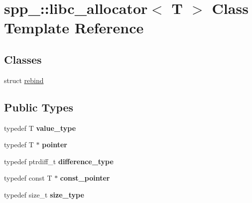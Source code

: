 \hypertarget{classspp___1_1libc__allocator}{}\section{spp\+\_\+\+:\+:libc\+\_\+allocator$<$ T $>$ Class Template Reference}
\label{classspp___1_1libc__allocator}
\subsection*{Classes}
\begin{DoxyCompactItemize}
\item 
struct \hyperlink{structspp___1_1libc__allocator_1_1rebind}{rebind}
\end{DoxyCompactItemize}
\subsection*{Public Types}
\begin{DoxyCompactItemize}
\item 
typedef T {\bfseries value\+\_\+type}\hypertarget{classspp___1_1libc__allocator_afe4fa699e49fd1c2f4b82547d164698e}{}\label{classspp___1_1libc__allocator_afe4fa699e49fd1c2f4b82547d164698e}

\item 
typedef T $\ast$ {\bfseries pointer}\hypertarget{classspp___1_1libc__allocator_a44d02c858595dc2c7995e1747dab358c}{}\label{classspp___1_1libc__allocator_a44d02c858595dc2c7995e1747dab358c}

\item 
typedef ptrdiff\+\_\+t {\bfseries difference\+\_\+type}\hypertarget{classspp___1_1libc__allocator_a26cd30f4c336f7ecddd19ac1de175e2f}{}\label{classspp___1_1libc__allocator_a26cd30f4c336f7ecddd19ac1de175e2f}

\item 
typedef const T $\ast$ {\bfseries const\+\_\+pointer}\hypertarget{classspp___1_1libc__allocator_ae6ef4ded49d1150c83a781cb828882fc}{}\label{classspp___1_1libc__allocator_ae6ef4ded49d1150c83a781cb828882fc}

\item 
typedef size\+\_\+t {\bfseries size\+\_\+type}\hypertarget{classspp___1_1libc__allocator_a2833d2b379ad067aed3f3d0ad14b61cc}{}\label{classspp___1_1libc__allocator_a2833d2b379ad067aed3f3d0ad14b61cc}

\end{DoxyCompactItemize}
